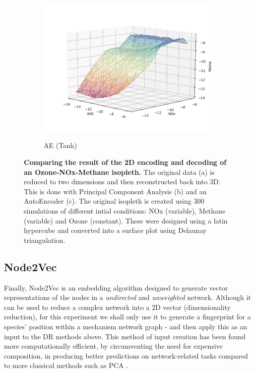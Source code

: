 \begin{figure}[H]
\begin{subfigure}{.33\textwidth}
  \includegraphics[width=\textwidth]{4fig/rae.png}
  \label{fig:iae}
  \caption{AE (Tanh)}
\end{subfigure}%
\caption{
\textbf{Comparing the result of the 2D encoding and decoding of an Ozone-NOx-Methane isopleth.} The original data (a) is reduced to two dimensions and then reconstructed back into 3D. This is done with Principal Component Analysis (b) and an AutoEncoder (c). The original isopleth is created using  300 simulations of different
 intial conditions: NOx (variable), Methane (variable) and Ozone (constant). These were designed using a latin hypercube and converted into a surface plot using Delaunay triangulation. }
\label{fig:aeiso}
\end{figure}

\subsection{Node2Vec}\label{sec:n2v}
Finally, Node2Vec is an embedding algorithm designed to generate vector representations of the nodes in a \textit{undirected} and \textit{unweighted} network. Although it can be used to reduce a complex network into a 2D vector (dimensionality reduction), for this experiment we shall only use it to generate a fingerprint for a species' position within a mechanism network graph - and then apply this as an input to the DR methods above. This method of input creation has been found more computationally efficient, by circumventing the need for expensive composition, in producing better predictions on network-related tasks compared to more classical methods such as PCA \citep{node2vec}.


